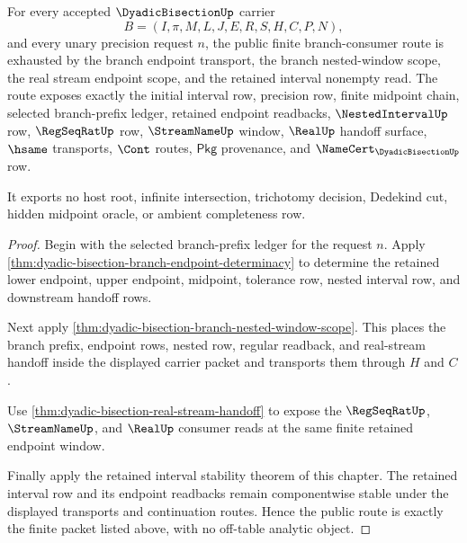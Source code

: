 \begin{theorem}
\label{thm:dyadic-bisection-public-branch-totality}
For every accepted $\DyadicBisectionUp$ carrier
$$
B=(I,\pi,M,L,J,E,R,S,H,C,P,N),
$$
and every unary precision request $n$, the public finite branch-consumer route
is exhausted by the branch endpoint transport, the branch nested-window scope,
the real stream endpoint scope, and the retained interval nonempty read. The
route exposes exactly the initial interval row, precision row, finite midpoint
chain, selected branch-prefix ledger, retained endpoint readbacks,
$\NestedIntervalUp$ row, $\RegSeqRatUp$ row, $\StreamNameUp$ window, $\RealUp$
handoff surface, $\hsame$ transports, $\Cont$ routes, $\mathsf{Pkg}$ provenance,
and $\NameCert_{\DyadicBisectionUp}$ row.

It exports no host root, infinite intersection, trichotomy decision, Dedekind
cut, hidden midpoint oracle, or ambient completeness row.
\end{theorem}
\begin{proof}
Begin with the selected branch-prefix ledger for the request $n$. Apply
\autoref{thm:dyadic-bisection-branch-endpoint-determinacy} to determine the
retained lower endpoint, upper endpoint, midpoint, tolerance row, nested
interval row, and downstream handoff rows.

Next apply \autoref{thm:dyadic-bisection-branch-nested-window-scope}. This
places the branch prefix, endpoint rows, nested row, regular readback, and
real-stream handoff inside the displayed carrier packet and transports them
through $H$ and $C$.

Use \autoref{thm:dyadic-bisection-real-stream-handoff} to expose the
$\RegSeqRatUp$, $\StreamNameUp$, and $\RealUp$ consumer reads at the same
finite retained endpoint window.

Finally apply the retained interval stability theorem of this chapter. The
retained interval row and its endpoint readbacks remain componentwise stable
under the displayed transports and continuation routes. Hence the public route
is exactly the finite packet listed above, with no off-table analytic object.
\end{proof}

